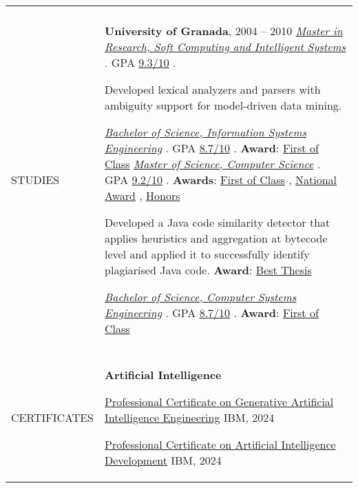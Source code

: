 \documentclass[letterpaper,10pt,oneside]{article}
\newcommand{\DatestampY}[1]{#1}
\newcommand{\itemspacingtwo}{\vspace{0.08cm}}
\newcommand{\sref}[2]{%
    \href{https://0/local/attachments/#1}{\textcolor{hiddenblue}{#2}}%
}
\newenvironment{body}
{\par\par
\begin{longtable}{p{0.145\textwidth}p{0.81\textwidth}}}
{\par\end{longtable}\par}
\renewcommand{\section}[3]{\\[-0.35cm]\pdfbookmark[2]{#2}{#3}\\%
\raggedleft  %
{\fontsize{9.5pt}{9.5pt}\selectfont\bfseries\raggedright%
\MakeUppercase{#1}}&}
\begin{document}
\begin{body}
\section{Studies}{Studies}{PDF:Studies}

\textbf{University of Granada}, \DatestampY{2004} -- \DatestampY{2010} \newline
\phantom{g}\textit{\sref{MRes-SoftComputingArtificialIntelligence-Diploma.pdf}{Master in Research, Soft Computing and Intelligent Systems}}. GPA \sref{MRes-SoftComputingArtificialIntelligence-Transcript-Spanish.pdf}{9.3/10}.
\begin{comp}
\item Developed lexical analyzers and parsers with ambiguity support for model-driven data mining.
\end{comp}
\phantom{g}\textit{\sref{BSc-ManagementInformationTechnology-Diploma.pdf}{Bachelor of Science, Information Systems Engineering}}. GPA \sref{BSc-ManagementInformationTechnology-Transcript.pdf}{8.7/10}. \textbf{Award}: \sref{BSc-ManagementInformationTechnology-Award-FirstOfPromotion.pdf}{First of Class}\newline
\phantom{g}\textit{\sref{MSc-ComputerEngineering-Diploma.pdf}{Master of Science, Computer Science}}. GPA \sref{MSc-ComputerEngineering-Transcript.pdf}{9.2/10}. \textbf{Awards}: \sref{MSc-ComputerEngineering-Award-FirstOfPromotion.pdf}{First of Class}, \sref{MSc-ComputerEngineering-Award-NationalAward.pdf}{National Award}, \sref{MSc-ComputerEngineering-Award-Distinction.pdf}{Honors}
\begin{comp}
\item Developed a Java code similarity detector that applies heuristics and aggregation at bytecode level and applied it to successfully identify plagiarised Java code. \textbf{Award}: \sref{MSc-ComputerEngineering-Award-BestMasterThesis.pdf}{Best Thesis}
\end{comp}
\phantom{g}\textit{\sref{BSc-SystemInformationTechnology-Diploma.pdf}{Bachelor of Science, Computer Systems Engineering}}. GPA \sref{BSc-SystemInformationTechnology-Transcript.pdf}{8.7/10}. \textbf{Award}: \sref{BSc-SystemInformationTechnology-Award-FirstOfPromotion.pdf}{First of Class}

\section{Certificates}{Certificates}{PDF:Certificates}
\textbf{Artificial Intelligence}
\begin{comp}
\item \sref{Certificate-Coursera-IBM-GenerativeAIEngineering.pdf}{Professional Certificate on Generative Artificial Intelligence Engineering} \textemdash{ }IBM, \DatestampY{2024}
\item \sref{Certificate-Coursera-IBM-AIDeveloper.pdf}{Professional Certificate on Artificial Intelligence Development} \textemdash{ }IBM, \DatestampY{2024}
\end{comp}
\itemspacingtwo


\end{body}
\end{document}

